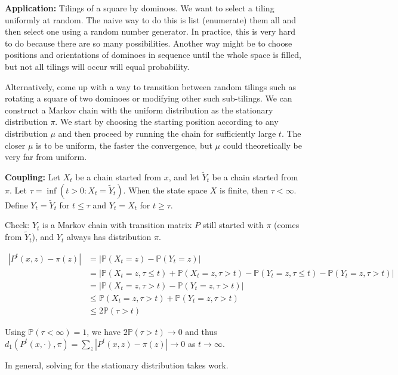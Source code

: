 \documentclass[../../../Master/AppliedStochastics.tex]{subfiles}
\newcommand{\I}{\infty}
\newcommand{\ta}{\tau}
\newcommand{\PP}{{\mathbb{P}}}
\begin{document}
\vspace{10mm}
\textbf{Application:} Tilings of a square by dominoes. We want to select a tiling uniformly at random. The naive way to do this is list (enumerate) them all and then select one using a random number generator. In practice, this is very hard to do because there are so many possibilities. Another way might be to choose positions and orientations of dominoes in sequence until the whole space is filled, but not all tilings will occur will equal probability. 

\vspace{5mm}
Alternatively, come up with a way to transition between random tilings such as rotating a square of two dominoes or modifying other such sub-tilings. We can construct a Markov chain with the uniform distribution as the stationary distribution $\pi$. We start by choosing the starting position according to any distribution $\mu$ and then proceed by running the chain for sufficiently large $t$. The closer $\mu$ is to be uniform, the faster the convergence, but $\mu$ could theoretically be very far from uniform.

\vspace{10mm}
\textbf{Coupling:} Let $X_t$ be a chain started from $x$, and let $\tilde{Y}_t$ be a chain started from $\pi$. Let $\ta=\inf(t>0:X_t=\tilde{Y}_t)$. When the state space $X$ is finite, then $\ta<\I$. Define $Y_t=\tilde{Y}_t$ for $t\leq \ta$ and $Y_t=X_t$ for $t\geq \ta$. 


\vspace{5mm}
Check: $Y_t$ is a Markov chain with transition matrix $P$ still started with $\pi$ (comes from $\tilde{Y}_t$), and $Y_t$ always has distribution $\pi$. 

$$\begin{aligned}
|P^t(x,z)-\pi(z)|&=|\PP(X_t=z)-\PP(Y_t=z)|\\&=|\PP(X_t=z,\ta\leq t)+\PP(X_t=z,\ta> t)-\PP(Y_t=z,\ta\leq t)-\PP(Y_t=z,\ta> t)|\\&=|\PP(X_t=z,\ta>t)-\PP(Y_t=z,\ta> t)|\\&\leq \PP(X_t=z,\ta>t)+\PP(Y_t=z,\ta>t)\\&\leq 2\PP(\ta>t)
\end{aligned}$$

Using $\PP(\ta<\I)=1$, we have $2\PP(\ta>t)\to 0$ and thus $d_1(P^t(x,\cdot),\pi)=\sum_z|P^t(x,z)-\pi(z)|\to 0$ as $t\to \I$.

\vspace{10mm}
In general, solving for the stationary distribution takes work.
\end{document}
